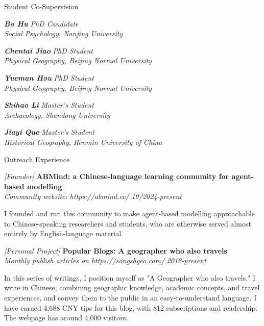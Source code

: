 \documentclass{resume} %
\newcommand{\projectentry}[4]{\textit{[#1]} {\bf #2} \\ \textnormal{\em #3} \hfill {\em #4}}
\newcommand{\superviseeentry}[4]{\textbf{\textit{#1}} \hfill {\em #2} \\ \textnormal{\em #3, #4}}
\begin{document}

\begin{rSection}{Student Co-Supervision}

\superviseeentry{Bo Hu}{PhD Candidate}{Social Psychology}{Nanjing University}

\superviseeentry{Chentai Jiao}{PhD Student}{Physical Geography}{Beijing Normal University}

\superviseeentry{Yueman Hou}{PhD Student}{Physical Geography}{Beijing Normal University}

\superviseeentry{Shihao Li}{Master's Student}{Archaeology}{Shandong University}

\superviseeentry{Jiayi Que}{Master's Student}{Historical Geography}{Renmin University of China}

\end{rSection}

\begin{rSection}{Outreach Experience}

    \projectentry{Founder}{ABMind: a Chinese-language learning community for agent-based modelling}{Community website: https://abmind.cc/}{10/2024-present}

    I founded and run this community to make agent-based modelling approachable to Chinese-speaking researchers and students, who are otherwise served almost entirely by English-language material.

    \projectentry{Personal Project}{Popular Blogs: A geographer who also travels}{Monthly publish articles on \textit{https://songshgeo.com/}}{2018-present}

    In this series of writings, I position myself as "A Geographer who also travels." I write in Chinese, combining geographic knowledge, academic concepts, and travel experiences, and convey them to the public in an easy-to-understand language. I have earned 4,688 CNY tips for this blog, with 812 subscriptions and readership. The webpage has around 4,000 visitors.

\end{rSection}
\end{document}
